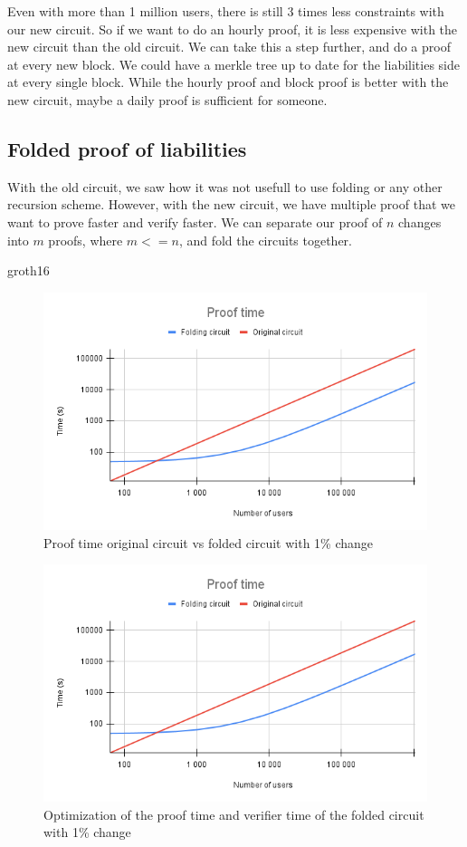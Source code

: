 Even with more than 1 million users, there is still 3 times less constraints with our new circuit.
So if we want to do an hourly proof, it is less expensive with the new circuit than the old circuit.
We can take this a step further, and do a proof at every new block. We could have a merkle tree up to date for the liabilities side at every single block.
While the hourly proof and block proof is better with the new circuit, maybe a daily proof is sufficient for someone.

\subsection{Folded proof of liabilities}
With the old circuit, we saw how it was not usefull to use folding or any other recursion scheme.
However, with the new circuit, we have multiple proof that we want to prove faster and verify faster.
We can separate our proof of $n$ changes into $m$ proofs, where $m <= n$, and fold the circuits together.

groth16
\begin{figure}[H]
   \centering
   \includegraphics[width=130mm]{Proof time.png}
   \caption{Proof time original circuit vs folded circuit with 1\% change}
   \label{overflow}
   \end{figure}

\begin{figure}[H]
   \centering
   \includegraphics[width=130mm]{Proof time.png}
   \caption{Optimization of the proof time and verifier time of the folded circuit with 1\% change}
   \label{overflow}
   \end{figure}

